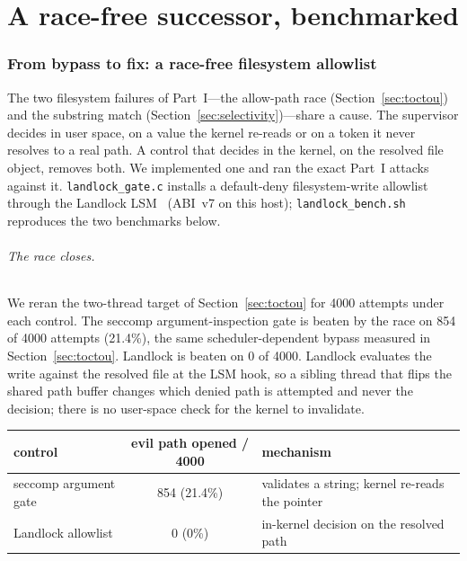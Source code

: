 \documentclass[11pt]{article}
\newcommand{\Nrace}{4000}
\newcommand{\RaceBench}{21.4}
\begin{document}
\part{A race-free successor, benchmarked}

\section{From bypass to fix: a race-free filesystem allowlist}\label{sec:landlock}

The two filesystem failures of Part~I---the allow-path race (Section~\ref{sec:toctou}) and the substring
match (Section~\ref{sec:selectivity})---share a cause. The supervisor decides in user space, on a value
the kernel re-reads or on a token it never resolves to a real path. A control that decides in the kernel,
on the resolved file object, removes both. We implemented one and ran the exact Part~I attacks against it.
\texttt{landlock\_gate.c} installs a default-deny filesystem-write allowlist through the Landlock
LSM~\cite{landlock} (ABI~v7 on this host); \texttt{landlock\_bench.sh} reproduces the two benchmarks below.

\paragraph{The race closes.} We reran the two-thread target of Section~\ref{sec:toctou} for \Nrace{}
attempts under each control. The seccomp argument-inspection gate is beaten by the race on 854 of \Nrace{}
attempts (\RaceBench\%), the same scheduler-dependent bypass measured in Section~\ref{sec:toctou}. Landlock
is beaten on 0 of \Nrace{}. Landlock evaluates the write against the resolved file at the LSM hook, so a
sibling thread that flips the shared path buffer changes which denied path is attempted and never the
decision; there is no user-space check for the kernel to invalidate.

\begin{center}
\begin{tabular}{lcl}
\toprule
control & evil path opened / \Nrace{} & mechanism \\
\midrule
seccomp argument gate & 854 (\RaceBench\%) & validates a string; kernel re-reads the pointer \\
Landlock allowlist & 0 (0\%) & in-kernel decision on the resolved path \\
\bottomrule
\end{tabular}
\end{center}
\end{document}
